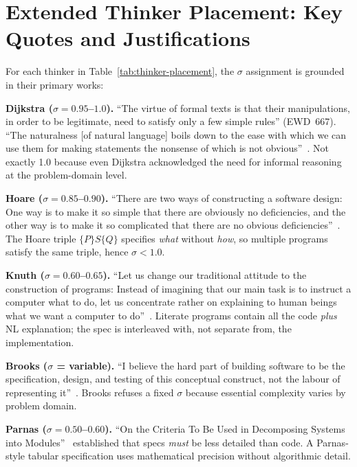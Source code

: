 \documentclass[11pt, a4paper, logo, copyright]{googledeepmind}
\begin{document}
\section{Extended Thinker Placement: Key Quotes and Justifications}
\label{app:thinker-quotes}

For each thinker in Table~\ref{tab:thinker-placement}, the $\sigma$ assignment is grounded in their primary works:

\textbf{Dijkstra ($\sigma = 0.95$--$1.0$).} ``The virtue of formal texts is that their manipulations, in order to be legitimate, need to satisfy only a few simple rules'' (EWD~667). ``The naturalness [of natural language] boils down to the ease with which we can use them for making statements the nonsense of which is not obvious''~\citep{dijkstra1978foolishness}. Not exactly 1.0 because even Dijkstra acknowledged the need for informal reasoning at the problem-domain level.

\textbf{Hoare ($\sigma = 0.85$--$0.90$).} ``There are two ways of constructing a software design: One way is to make it so simple that there are obviously no deficiencies, and the other way is to make it so complicated that there are no obvious deficiencies''~\citep{hoare1981emperor}. The Hoare triple $\{P\}S\{Q\}$ specifies \emph{what} without \emph{how}, so multiple programs satisfy the same triple, hence $\sigma < 1.0$.

\textbf{Knuth ($\sigma = 0.60$--$0.65$).} ``Let us change our traditional attitude to the construction of programs: Instead of imagining that our main task is to instruct a computer what to do, let us concentrate rather on explaining to human beings what we want a computer to do''~\citep{knuth1984literate}. Literate programs contain all the code \emph{plus} NL explanation; the spec is interleaved with, not separate from, the implementation.

\textbf{Brooks ($\sigma$ = variable).} ``I believe the hard part of building software to be the specification, design, and testing of this conceptual construct, not the labour of representing it''~\citep{brooks1987nosilver}. Brooks refuses a fixed $\sigma$ because essential complexity varies by problem domain.

\textbf{Parnas ($\sigma = 0.50$--$0.60$).} ``On the Criteria To Be Used in Decomposing Systems into Modules''~\citep{parnas1972criteria} established that specs \emph{must} be less detailed than code. A Parnas-style tabular specification uses mathematical precision without algorithmic detail.
\end{document}
